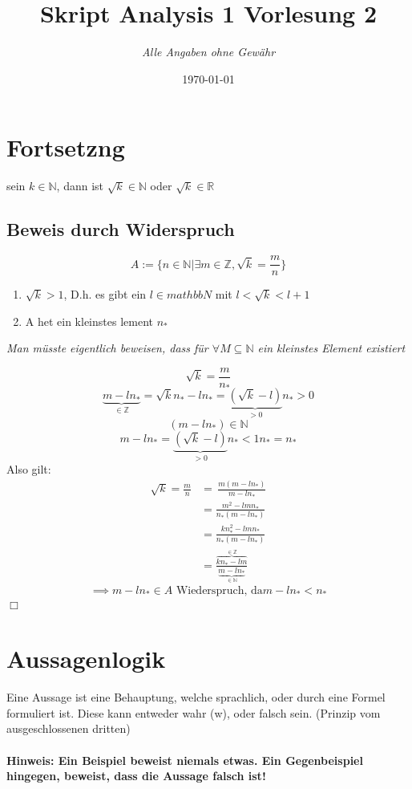 \documentclass{article}
\title{Skript Analysis 1 Vorlesung 2} %
\author{\textit{Alle Angaben ohne Gewähr}} %
\date{\today} %
\begin{document}

	\maketitle %
    \section{Fortsetzng}
        sein $k \in \mathbb{N}$, dann ist $\sqrt{k} \in \mathbb{N}$ oder $\sqrt{k} \in \mathbb{R}$
        \subsection*{Beweis durch Widerspruch}
            $$A:=\{n\in\mathbb{N}|\exists m\in\mathbb{Z}, \sqrt{k}=\frac{m}{n}\}$$
            \begin{enumerate}
                \item $\sqrt{k}>1$, D.h. es gibt ein $l\in mathbb{N}$ mit $l<\sqrt{k}<l+1$
                \item A het ein kleinstes lement $n_*$
            \end{enumerate}
            \textit{Man müsste eigentlich beweisen, dass für $\forall M\subseteq \mathbb{N}$ ein kleinstes Element existiert}
            
             $$\sqrt{k}=\frac{m}{n_*}$$
             $$\underbrace{m-ln_*}_{\in \mathbb{Z}}=\sqrt{k}n_*-ln_*=\underbrace{(\sqrt{k}-l)}_{>0}n_*>0$$
             $$(m-ln_*)\in \mathbb{N}$$
             $$m-ln_*=\underbrace{(\sqrt{k}-l)}_{>0}n_*<1n_*=n_*$$
             Also gilt:
            \begin{align*}
               \sqrt{k}=\frac{m}{n}&=\, \frac{m(m-ln_*)}{m-ln_*}\\
               \,&=\frac{m^2-lmn_*}{n_*(m-ln_*)}\\
               \, &=\frac{kn_*^2-lmn_*}{n_*(m-ln_*)}\\
               \, &=\frac{\overbrace{kn_*-lm}^{\in \mathbb{Z}}}{\underbrace{m-ln_*}_{\in \mathbb{N}}}
            \end{align*}
            $$\implies m-ln_*\in A \text{ Wiederspruch, da} m-ln_*<n_*$$
            \hfill $\Box$

    \section{Aussagenlogik}
        Eine Aussage ist eine Behauptung, welche sprachlich, oder durch eine Formel formuliert ist. Diese kann entweder wahr (w), oder falsch sein. (Prinzip vom ausgeschlossenen dritten)\\\\
        \textbf{Hinweis: Ein Beispiel beweist niemals etwas. Ein Gegenbeispiel hingegen, beweist, dass die Aussage falsch ist!}\\\
\end{document}
